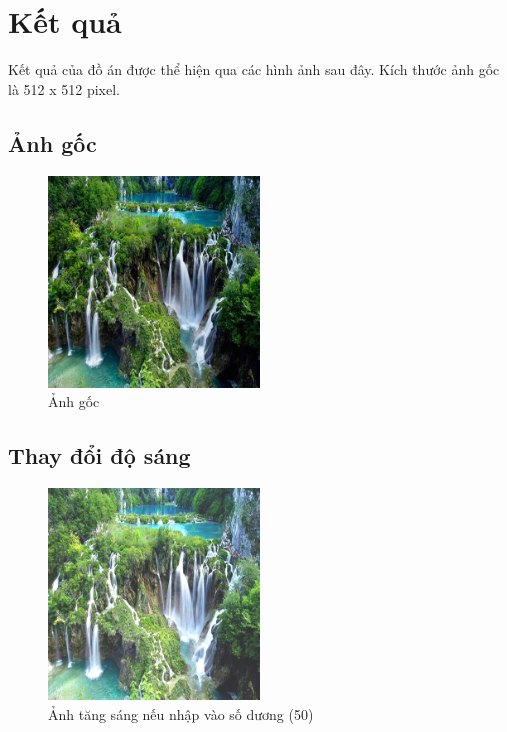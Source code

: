 \section{Kết quả}
Kết quả của đồ án được thể hiện qua các hình ảnh sau đây. Kích thước ảnh gốc là 512 x 512 pixel.

\subsection{Ảnh gốc}
\begin{figure}[H]
	\centering
	\includegraphics[width=0.5\textwidth]{images/512.jpg}
	\caption{Ảnh gốc}
	\label{fig:original}
\end{figure}

\subsection{Thay đổi độ sáng}
\begin{figure}[H]
	\centering
	\includegraphics[width=0.5\textwidth]{images/res/512_bright_asc.png}
	\caption{Ảnh tăng sáng nếu nhập vào số dương (50) }
	\label{fig:bright}
\end{figure}

